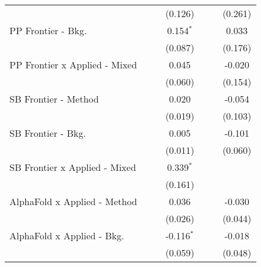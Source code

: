 \begin{tabular}{lcccccc}
                                               &                &                & (0.126)        &                &              & (0.261)\\   
   PP Frontier - Bkg.                          &                &                & 0.154$^{*}$    &                &              & 0.033\\   
                                               &                &                & (0.087)        &                &              & (0.176)\\   
   PP Frontier x Applied - Mixed               &                &                & 0.045          &                &              & -0.020\\   
                                               &                &                & (0.060)        &                &              & (0.154)\\   
   SB Frontier - Method                        &                &                & 0.020          &                &              & -0.054\\   
                                               &                &                & (0.019)        &                &              & (0.103)\\   
   SB Frontier - Bkg.                          &                &                & 0.005          &                &              & -0.101\\   
                                               &                &                & (0.011)        &                &              & (0.060)\\   
   SB Frontier x Applied - Mixed               &                &                & 0.339$^{*}$    &                &              &   \\   
                                               &                &                & (0.161)        &                &              &   \\   
   AlphaFold x Applied - Method                &                &                & 0.036          &                &              & -0.030\\   
                                               &                &                & (0.026)        &                &              & (0.044)\\   
   AlphaFold x Applied - Bkg.                  &                &                & -0.116$^{*}$   &                &              & -0.018\\   
                                               &                &                & (0.059)        &                &              & (0.048)\\   

\end{tabular}
